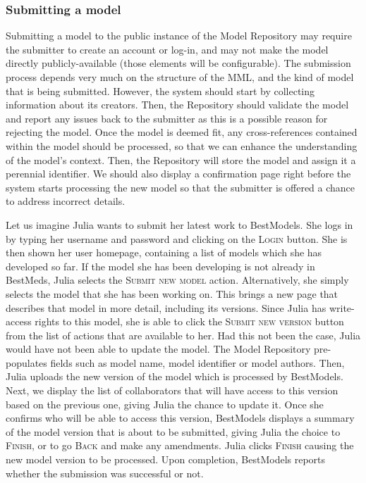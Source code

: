 \subsubsection{Submitting a model}
Submitting a model to the public instance of the \ddmore Model Repository may require the submitter to create an account or log-in, and may not make the model directly publicly-available (those elements will be configurable). The submission process depends very much on the structure of the MML, and the kind of model that is being submitted. However, the system should start by collecting information about its creators. Then, the Repository should validate the model and report any issues back to the submitter as this is a possible reason for rejecting the model. Once the model is deemed fit, any cross-references contained within the model should be processed, so that we can enhance the understanding of the model's context. Then, the Repository will store the model and assign it a perennial identifier. We should also display a confirmation page right before the system starts processing the new model so that the submitter is offered a chance to address incorrect details.

Let us imagine Julia wants to submit her latest work to BestModels. She logs in by typing her username and password and clicking on the \textsc{Login} button. She is then shown her user homepage, containing a list of models which she has developed so far. If the model she has been developing is not already in BestMeds, Julia selects the \textsc{Submit new model} action. Alternatively, she simply selects the model that she has been working on. This brings a new page that describes that model in more detail, including its versions. Since Julia has write-access rights to this model, she is able to click the \textsc{Submit new version} button from the list of actions that are available to her. Had this not been the case, Julia would have not been able to update the model. The Model Repository pre-populates fields such as model name, model identifier or model authors. Then, Julia uploads the new version of the model which is processed by BestModels. Next, we display the list of collaborators that will have access to this version based on the previous one, giving Julia the chance to update it. Once she confirms who will be able to access this version, BestModels displays a summary of the model version that is about to be submitted, giving Julia the choice to \textsc{Finish}, or to go \textsc{Back} and make any amendments. Julia clicks \textsc{Finish} causing the new model version to be processed. Upon completion, BestModels reports whether the submission was successful or not.

